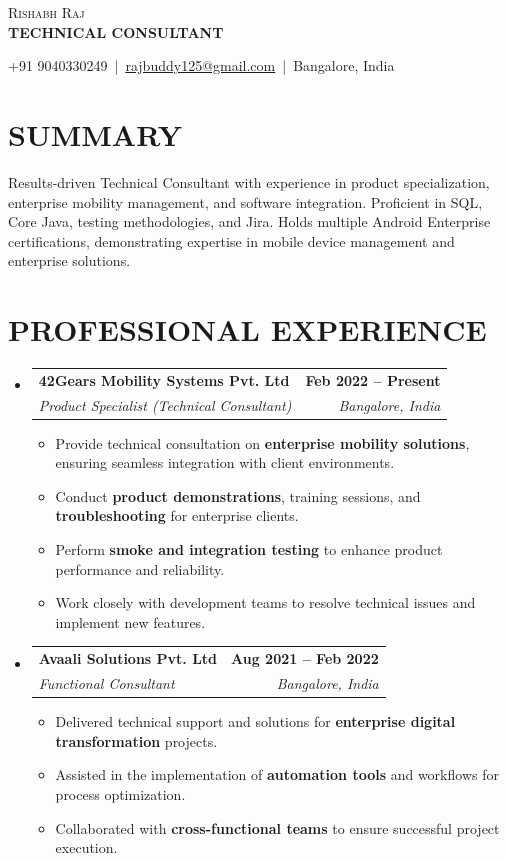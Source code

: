 \documentclass[letterpaper,11pt]{article}
\makeatletter
\newcommand{\resumeItem}[1]{
  \item\small{
    {#1 \vspace{-2pt}}
  }
}
\newcommand{\resumeSubheading}[4]{
  \vspace{-2pt}\item
    \begin{tabular*}{1.0\textwidth}[t]{l@{\extracolsep{\fill}}r}
      \textbf{\large#1} & \textbf{\small #2} \\
      \textit{\large#3} & \textit{\small #4} \\
      
    \end{tabular*}\vspace{-7pt}
}
\newcommand{\resumeSubHeadingListStart}{\begin{itemize}[leftmargin=0.0in, label={}]}
\newcommand{\resumeSubHeadingListEnd}{\end{itemize}}
\newcommand{\resumeItemListStart}{\begin{itemize}}
\newcommand{\resumeItemListEnd}{\end{itemize}\vspace{-5pt}}
\makeatother
\begin{document}
\begin{center}
{\Huge \scshape Rishabh Raj} \\ \vspace{3pt}
{\large \textbf{TECHNICAL CONSULTANT}} \\ \vspace{5pt}

\small 
+91 9040330249 \,|\, 
\href{mailto:rajbuddy125@gmail.com}{rajbuddy125@gmail.com} \,|\, 
Bangalore, India
\end{center}

\vspace{-2pt}

\section{SUMMARY}
Results-driven Technical Consultant with experience in product specialization, enterprise mobility management, and software integration. Proficient in SQL, Core Java, testing methodologies, and Jira. Holds multiple Android Enterprise certifications, demonstrating expertise in mobile device management and enterprise solutions.

\section{PROFESSIONAL EXPERIENCE}
    \resumeSubHeadingListStart
        \resumeSubheading{42Gears Mobility Systems Pvt. Ltd}{Feb 2022 -- Present}{Product Specialist (Technical Consultant)}{Bangalore, India}
        \vspace{2pt}
            \resumeItemListStart
                \resumeItem{\normalsize{Provide technical consultation on \textbf{enterprise mobility solutions}, ensuring seamless integration with client environments.}}
                \resumeItem{\normalsize{Conduct \textbf{product demonstrations}, training sessions, and \textbf{troubleshooting} for enterprise clients.}}
                \resumeItem{\normalsize{Perform \textbf{smoke and integration testing} to enhance product performance and reliability.}}
                \resumeItem{\normalsize{Work closely with development teams to resolve technical issues and implement new features.}}
            \resumeItemListEnd

        \resumeSubheading{Avaali Solutions Pvt. Ltd}{Aug 2021 -- Feb 2022}{Functional Consultant}{Bangalore, India}
        \vspace{2pt}
            \resumeItemListStart
                \resumeItem{\normalsize{Delivered technical support and solutions for \textbf{enterprise digital transformation} projects.}}
                \resumeItem{\normalsize{Assisted in the implementation of \textbf{automation tools} and workflows for process optimization.}}
                \resumeItem{\normalsize{Collaborated with \textbf{cross-functional teams} to ensure successful project execution.}}
            \resumeItemListEnd
    \resumeSubHeadingListEnd
\end{document}
